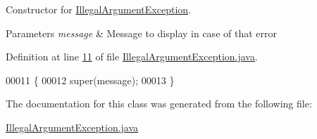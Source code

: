 Constructor for \hyperlink{classIllegalArgumentException}{Illegal\-Argument\-Exception}. 


\begin{DoxyParams}{Parameters}
{\em message} & Message to display in case of that error \\
\hline
\end{DoxyParams}


Definition at line \hyperlink{IllegalArgumentException_8java_source_l00011}{11} of file \hyperlink{IllegalArgumentException_8java_source}{Illegal\-Argument\-Exception.\-java}.


\begin{DoxyCode}
00011                                                    \{
00012         super(message);
00013     \}
\end{DoxyCode}


The documentation for this class was generated from the following file\-:\begin{DoxyCompactItemize}
\item 
\hyperlink{IllegalArgumentException_8java}{Illegal\-Argument\-Exception.\-java}\end{DoxyCompactItemize}
